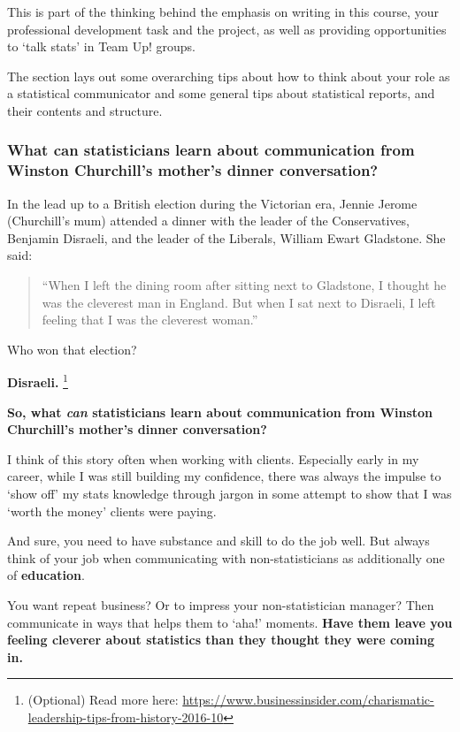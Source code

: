 \documentclass[
  openany]{book}
\begin{document}
This is part of the thinking behind the emphasis on writing in this course, your professional development task and the project, as well as providing opportunities to `talk stats' in Team Up! groups.

The section lays out some overarching tips about how to think about your role as a statistical communicator and some general tips about statistical reports, and their contents and structure.

\hypertarget{what-can-statisticians-learn-about-communication-from-winston-churchills-mothers-dinner-conversation}{%
\subsubsection{What can statisticians learn about communication from Winston Churchill's mother's dinner conversation?}\label{what-can-statisticians-learn-about-communication-from-winston-churchills-mothers-dinner-conversation}}

In the lead up to a British election during the Victorian era, Jennie Jerome (Churchill's mum) attended a dinner with the leader of the Conservatives, Benjamin Disraeli, and the leader of the Liberals, William Ewart Gladstone. She said:

\begin{quote}
``When I left the dining room after sitting next to Gladstone, I thought he was the cleverest man in England. But when I sat next to Disraeli, I left feeling that I was the cleverest woman.''
\end{quote}

Who won that election?

\textbf{Disraeli.} \footnote{(Optional) Read more here: \url{https://www.businessinsider.com/charismatic-leadership-tips-from-history-2016-10}}

\textbf{So, what \emph{can} statisticians learn about communication from Winston Churchill's mother's dinner conversation?}

I think of this story often when working with clients. Especially early in my career, while I was still building my confidence, there was always the impulse to `show off' my stats knowledge through jargon in some attempt to show that I was `worth the money' clients were paying.

And sure, you need to have substance and skill to do the job well. But always think of your job when communicating with non-statisticians as additionally one of \textbf{education}.

You want repeat business? Or to impress your non-statistician manager? Then communicate in ways that helps them to `aha!' moments. \textbf{Have them leave you feeling cleverer about statistics than they thought they were coming in.}
\end{document}
